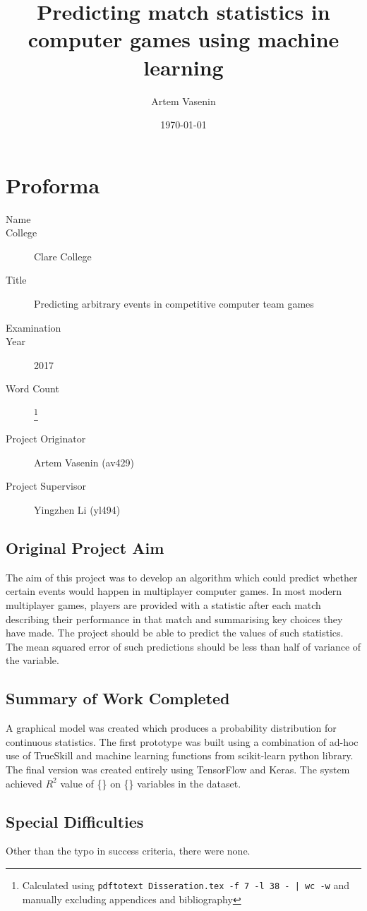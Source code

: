 \documentclass[12pt,a4paper]{book}
\title{Predicting match statistics in computer games using machine learning}
\author{Artem Vasenin}
\date{\today}
\newcommand\college{Clare College}
\begin{document}
\frontmatter
\maketitle

\section*{Proforma}
\begin{description}
\item[Name] \theauthor
\item[College] \college
\item[Title] Predicting arbitrary events in competitive computer team games
\item[Examination] %
\item[Year] 2017
\item[Word Count] \footnote{Calculated using \lstinline+pdftotext Disseration.tex -f 7 -l 38 - | wc -w+ and manually excluding appendices and bibliography} %
\item[Project Originator] Artem Vasenin (av429)
\item[Project Supervisor] Yingzhen Li (yl494)
\end{description}

\subsection*{Original Project Aim}
The aim of this project was to develop an algorithm which could predict whether certain events would happen in multiplayer computer games.
In most modern multiplayer games, players are provided with a statistic after each match describing their performance in that match and summarising key choices they have made.
The project should be able to predict the values of such statistics.
The mean squared error of such predictions should be less than half of variance of the variable.
\subsection*{Summary of Work Completed}
A graphical model was created which produces a probability distribution for continuous statistics.
The first prototype was built using a combination of ad-hoc use of TrueSkill and machine learning functions from scikit-learn python library.
The final version was created entirely using TensorFlow and Keras.
The system achieved $R^2$ value of \{\}
on \{\}
variables in the dataset.
\subsection*{Special Difficulties}
Other than the typo in success criteria, there were none.
\end{document}
